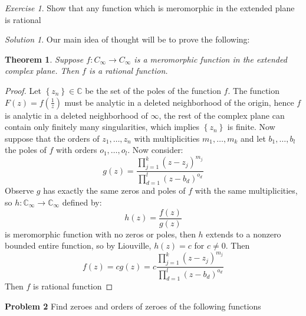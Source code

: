 \documentclass[notitlepage]{article}
\newtheorem{thm}{Theorem}
\theoremstyle{definition}
\theoremstyle{remark}
\newtheorem{exc}{Exercise}
\newtheorem*{sol}{Solution}
\newcommand{\set}[1]{\left\lbrace #1 \right\rbrace}
\newcommand{\CC}{\mathbb{C}}
\begin{document}
\begin{exc}
	Show that any function which is meromorphic in the extended plane is rational
\end{exc}
\begin{sol}
	Our main idea of thought will be to prove the following:
	\begin{thm}
		Suppose $ f: C_\infty \rightarrow C_\infty $ is a meromorphic function in the extended complex plane. Then $ f $ is a rational function.
	\end{thm}
	\begin{proof}
		Let $ \set{z_n} \in \CC $ be the set of the poles of the function $ f $. The function $ F(z) = f(\frac{1}{z}) $ must be analytic in a deleted neighborhood of the origin, hence $ f $ is analytic in a deleted neighborhood of $ \infty $, the rest of the complex plane can contain only finitely many singularities, which implies $ \set{z_n} $ is finite. Now suppose that the orders of $ z_1, \ldots, z_n $ with multiplicities $ m_1, \ldots, m_k $ and let $ b_1, \ldots, b_l $ the poles of $ f $ with orders $ o_1, \ldots, o_l $. Now consider:
		\[ g(z) = \frac{\prod_{j =1}^{k}(z- z_j)^{m_j}}{\prod_{d=1}^{l}(z - b_d)^{o_d} }\]
		Observe $ g $ has exactly the same zeros and poles of $ f $ with the same multiplicities, so $ h: \CC_\infty \rightarrow \CC_\infty $ defined by:
		\[ h(z) = \frac{f(z)}{g(z)} \]
		is meromorphic function with no zeros or poles, then $ h $ extends to a nonzero bounded entire function, so by Liouville, $ h(z) = c $ for $ c \neq 0 $. Then 
		\[ f(z) = c g(z) = c \frac{\prod_{j =1}^{k}(z- z_j)^{m_j}}{\prod_{d=1}^{l}(z - b_d)^{o_d} } \]
		Then $ f $ is rational function
	\end{proof}
\end{sol}
\textbf{\large Problem 2}
Find zeroes and orders of zeroes of the following functions
\end{document}
